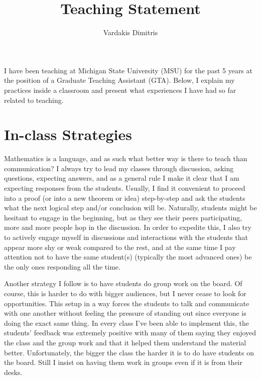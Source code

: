 \documentclass[11pt]{amsart}	%
\title{Teaching Statement}	%
\author{Vardakis Dimitris}	%
\begin{document}
\maketitle

I have been teaching at Michigan State University (MSU) for the past 5 years at the position of a Graduate Teaching Assistant (GTA). Below, I explain my practices inside a classroom and present what experiences I have had so far related to teaching.

\section*{In-class Strategies}

Mathematics is a language, and as such what better way is there to teach than communication? I always try to lead my classes through discussion, asking questions, expecting answers, and as a general rule I make it clear that I am expecting responses from the students. Usually, I find it convenient to proceed into a proof (or into a new theorem or idea) step-by-step and ask the students what the next logical step and/or conclusion will be. Naturally, students might be hesitant to engage in the beginning, but as they see their peers participating, more and more people hop in the discussion. In order to expedite this, I also try to actively engage myself in discussions and interactions with the students that appear more shy or weak compared to the rest, and at the same time I pay attention not to have the same student(s) (typically the most advanced ones) be the only ones responding all the time.

Another strategy I follow is to have students do group work on the board. Of course, this is harder to do with bigger audiences, but I never cease to look for opportunities. This setup in a way forces the students to talk and communicate with one another without feeling the pressure of standing out since everyone is doing the exact same thing. In every class I've been able to implement this, the students' feedback was extremely positive with many of them saying they enjoyed the class and the group work and that it helped them understand the material better. Unfortunately, the bigger the class the harder it is to do have students on the board. Still I insist on having them work in groups even if it is from their desks.
\end{document}

